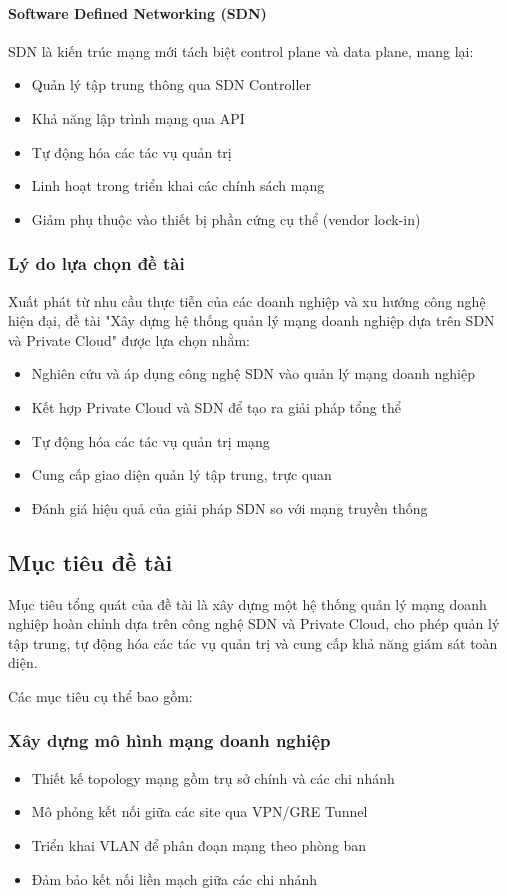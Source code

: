 \paragraph{Software Defined Networking (SDN)}
SDN là kiến trúc mạng mới tách biệt control plane và data plane, mang lại:
\begin{itemize}
    \item Quản lý tập trung thông qua SDN Controller
    \item Khả năng lập trình mạng qua API
    \item Tự động hóa các tác vụ quản trị
    \item Linh hoạt trong triển khai các chính sách mạng
    \item Giảm phụ thuộc vào thiết bị phần cứng cụ thể (vendor lock-in)
\end{itemize}

\subsubsection{Lý do lựa chọn đề tài}
Xuất phát từ nhu cầu thực tiễn của các doanh nghiệp và xu hướng công nghệ hiện đại, đề tài "Xây dựng hệ thống quản lý mạng doanh nghiệp dựa trên SDN và Private Cloud" được lựa chọn nhằm:
\begin{itemize}
    \item Nghiên cứu và áp dụng công nghệ SDN vào quản lý mạng doanh nghiệp
    \item Kết hợp Private Cloud và SDN để tạo ra giải pháp tổng thể
    \item Tự động hóa các tác vụ quản trị mạng
    \item Cung cấp giao diện quản lý tập trung, trực quan
    \item Đánh giá hiệu quả của giải pháp SDN so với mạng truyền thống
\end{itemize}

\subsection{Mục tiêu đề tài}

Mục tiêu tổng quát của đề tài là xây dựng một hệ thống quản lý mạng doanh nghiệp hoàn chỉnh dựa trên công nghệ SDN và Private Cloud, cho phép quản lý tập trung, tự động hóa các tác vụ quản trị và cung cấp khả năng giám sát toàn diện.

Các mục tiêu cụ thể bao gồm:

\subsubsection{Xây dựng mô hình mạng doanh nghiệp}
\begin{itemize}
    \item Thiết kế topology mạng gồm trụ sở chính và các chi nhánh
    \item Mô phỏng kết nối giữa các site qua VPN/GRE Tunnel
    \item Triển khai VLAN để phân đoạn mạng theo phòng ban
    \item Đảm bảo kết nối liền mạch giữa các chi nhánh
\end{itemize}

